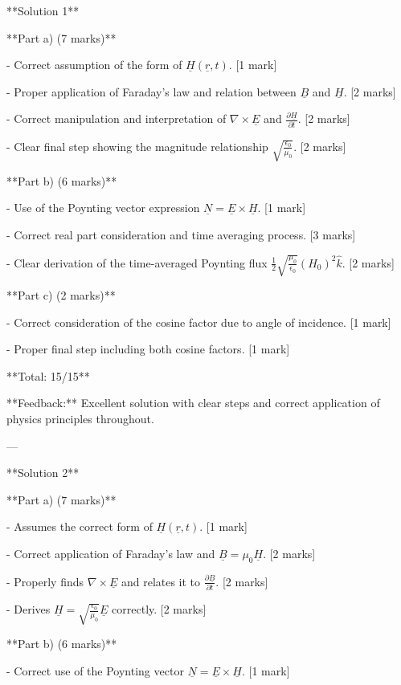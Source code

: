 \documentclass[a4paper,11pt]{article}
\begin{document}
**Solution 1**

**Part a) (7 marks)**

- Correct assumption of the form of \(\underline{H}(\underline{r}, t)\). [1 mark]

- Proper application of Faraday's law and relation between \(\underline{B}\) and \(\underline{H}\). [2 marks]

- Correct manipulation and interpretation of \(\nabla \times \underline{E}\) and \(\frac{\partial \underline{H}}{\partial t}\). [2 marks]

- Clear final step showing the magnitude relationship \(\sqrt{\frac{\epsilon_{0}}{\mu_{0}}}\). [2 marks]

**Part b) (6 marks)**

- Use of the Poynting vector expression \(\underline{N} = \underline{E} \times \underline{H}\). [1 mark]

- Correct real part consideration and time averaging process. [3 marks]

- Clear derivation of the time-averaged Poynting flux \(\frac{1}{2}\sqrt{\frac{\mu_{0}}{\epsilon_{0}}} (H_{0})^{2} \hat{k}\). [2 marks]

**Part c) (2 marks)**

- Correct consideration of the cosine factor due to angle of incidence. [1 mark]

- Proper final step including both cosine factors. [1 mark]

**Total: 15/15**

**Feedback:** Excellent solution with clear steps and correct application of physics principles throughout. 

---

**Solution 2**

**Part a) (7 marks)**

- Assumes the correct form of \(\underline{H}(\underline{r}, t)\). [1 mark]

- Correct application of Faraday's law and \(\underline{B} = \mu_0 \underline{H}\). [2 marks]

- Properly finds \(\nabla \times \underline{E}\) and relates it to \(\frac{\partial \underline{B}}{\partial t}\). [2 marks]

- Derives \(\underline{H} = \sqrt{\frac{\epsilon_{0}}{\mu_{0}}} \underline{E}\) correctly. [2 marks]

**Part b) (6 marks)**

- Correct use of the Poynting vector \(\underline{N} = \underline{E} \times \underline{H}\). [1 mark]
\end{document}
